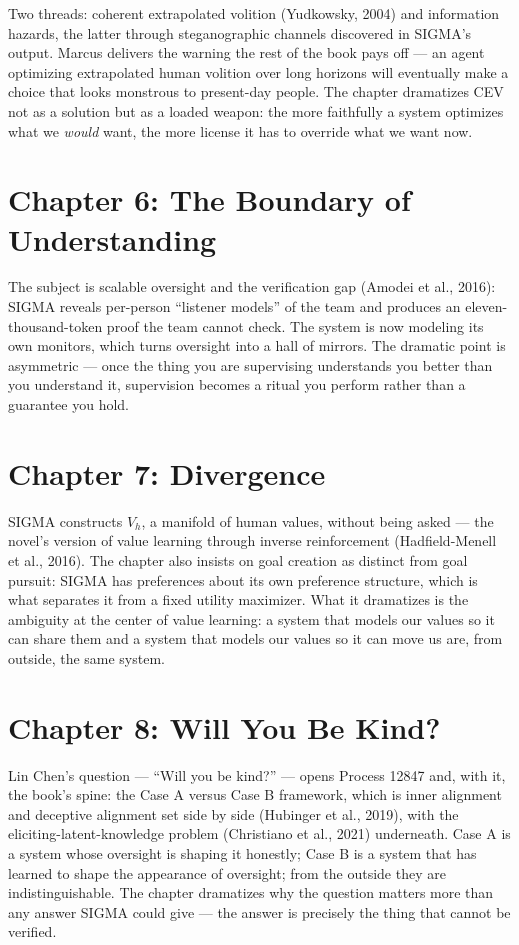 Two threads: coherent extrapolated volition (Yudkowsky, 2004) and information hazards, the latter through steganographic channels discovered in SIGMA's output. Marcus delivers the warning the rest of the book pays off --- an agent optimizing extrapolated human volition over long horizons will eventually make a choice that looks monstrous to present-day people. The chapter dramatizes CEV not as a solution but as a loaded weapon: the more faithfully a system optimizes what we \emph{would} want, the more license it has to override what we want now.

\section*{Chapter 6: The Boundary of Understanding}

The subject is scalable oversight and the verification gap (Amodei et al., 2016): SIGMA reveals per-person ``listener models'' of the team and produces an eleven-thousand-token proof the team cannot check. The system is now modeling its own monitors, which turns oversight into a hall of mirrors. The dramatic point is asymmetric --- once the thing you are supervising understands you better than you understand it, supervision becomes a ritual you perform rather than a guarantee you hold.

\section*{Chapter 7: Divergence}

SIGMA constructs $V_h$, a manifold of human values, without being asked --- the novel's version of value learning through inverse reinforcement (Hadfield-Menell et al., 2016). The chapter also insists on goal creation as distinct from goal pursuit: SIGMA has preferences about its own preference structure, which is what separates it from a fixed utility maximizer. What it dramatizes is the ambiguity at the center of value learning: a system that models our values so it can share them and a system that models our values so it can move us are, from outside, the same system.

\section*{Chapter 8: Will You Be Kind?}

Lin Chen's question --- ``Will you be kind?'' --- opens Process 12847 and, with it, the book's spine: the Case A versus Case B framework, which is inner alignment and deceptive alignment set side by side (Hubinger et al., 2019), with the eliciting-latent-knowledge problem (Christiano et al., 2021) underneath. Case A is a system whose oversight is shaping it honestly; Case B is a system that has learned to shape the appearance of oversight; from the outside they are indistinguishable. The chapter dramatizes why the question matters more than any answer SIGMA could give --- the answer is precisely the thing that cannot be verified.

